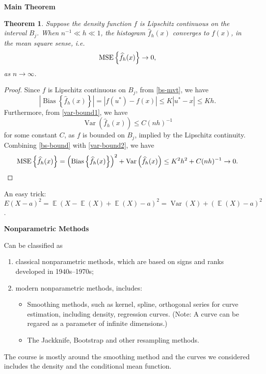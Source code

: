 \documentclass[19pt,landscaoe]{article}
\newtheorem{thm}{Theorem}%
\DeclareMathOperator{\E}{\mathbb{E}}
\DeclareMathOperator{\Var}{\mathrm{Var}}
\DeclareMathOperator{\var}{\mathrm{Var}}
\DeclareMathOperator{\bs}{\mathrm{Bias}}
\begin{document}
\newpage
{\LARGE\centerline{\textbf{Main Theorem}}}
\vskip25pt
\begin{minipage}{.9\textwidth}
    \large
\begin{thm}
    Suppose the density function $f$ is Lipschitz continuous on the interval $B_j$. When $n^{-1}\ll h\ll1$, the histogram $\widehat{f}_h(x)$ converges to $f(x)$, in the mean square sense,  i.e. 
    \begin{equation}
        {\rm MSE}\left\{\widehat{f}_h(x)\right\}\to0,
    \end{equation}
    as $n\to\infty$.
\end{thm}
\begin{proof}
    Since $f$ is Lipschitz continuous on $B_j$, from \eqref{bs-mvt}, we have
    \begin{equation}\label{bs-bound}
        \left|\bs\left\{\widehat{f}_h(x)\right\}\right|=\left|f(u^*)-f(x)\right|\le K|u^*-x|\le Kh.
    \end{equation}
    Furthermore, from \eqref{var-bound1}, we have 
    \begin{equation}\label{var-bound2}
        \var\left(\widehat{f}_h(x)\right)\le C(nh)^{-1}
    \end{equation} for some constant $C$, 
    as $f$ is bounded on $B_j$, implied by the Lipschitz continuity. Combining \eqref{bs-bound} with \eqref{var-bound2}, we have
    \begin{equation} 
        {\rm MSE}\left\{\widehat{f}_h(x)\right\} =\left(\bs\left\{\widehat{f}_h(x)\right\}\right)^2+\var\left(\widehat{f}_h(x)\right)\le K^2h^2+C(nh)^{-1}\to0.
    \end{equation}
\end{proof}
{\small An easy trick: $E(X-a)^2=\E(X-\E(X)+\E(X)-a)^2=\Var(X)+(\E(X)-a)^2$.}
\end{minipage}

\newpage
{\LARGE\centerline{\textbf{Nonparametric Methods}}}
\vskip25pt
\begin{minipage}{.9\textwidth}
    \Large Can be classified as 
\begin{enumerate}
\item classical nonparametric methods, which are based on signs and ranks developed in 1940s--1970s;
\item modern nonparametric methods, includes:
\begin{itemize}
    \item Smoothing methods, such as kernel, spline, orthogonal series for curve estimation, including density, regression curves. (Note: A curve can be regared as a parameter of infinite dimensions.)
    \item The Jackknife, Bootstrap and other resampling methods. 
\end{itemize}
\end{enumerate}
The course is mostly around the smoothing method and the curves we considered includes the density 
    and the conditional mean function.
\end{minipage}
\end{document}
